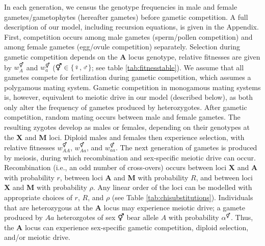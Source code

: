 \documentclass[12pt]{article}
\begin{document}
In each generation, we census the genotype frequencies in male and female gametes/gametophytes (hereafter gametes) before gametic competition. 
A full description of our model, including recursion equations, is given in the Appendix. 
First, competition occurs among male gametes (sperm/pollen competition) and among female gametes (egg/ovule competition) separately. 
Selection during gametic competition depends on the \textbf{A} locus genotype, relative fitnesses are given by $w_A^\Hermaphrodite$ and $w_a^\Hermaphrodite$ ($\Hermaphrodite \in \{\female,\male\}$; see table \ref{tab:fitnesstable}). %
We assume that all gametes compete for fertilization during gametic competition, which assumes a polygamous mating system. 
Gametic competition in monogamous mating systems is, however, equivalent to meiotic drive in our model (described below), as both only alter the frequency of gametes produced by heterozygotes. 
After gametic competition, random mating occurs between male and female gametes.
The resulting zygotes develop as males or females, depending on their genotypes at the \textbf{X} and \textbf{M} loci. %
Diploid males and females then experience selection, with relative fitnesses $w_{AA}^{\Hermaphrodite}$, $w_{Aa}^{\Hermaphrodite}$, and $w_{aa}^{\Hermaphrodite}$. %
The next generation of gametes is produced by meiosis, during which recombination and sex-specific meiotic drive can occur. 
Recombination (i.e., an odd number of cross-overs) occurs between loci \textbf{X} and \textbf{A} with probability $r$, between loci \textbf{A} and \textbf{M} with probability $R$, and between loci \textbf{X} and \textbf{M} with probability $\rho$.
Any linear order of the loci can be modelled with appropriate choices of $r$, $R$, and $\rho$ (see Table \ref{tab:chisubstitutions}). 
Individuals that are heterozygous at the \textbf{A} locus may experience meiotic drive; a gamete produced by $Aa$ heterozgotes of sex $\Hermaphrodite$ bear allele $A$ with probability $\alpha^\Hermaphrodite$. 
Thus, the \textbf{A} locus can experience sex-specific gametic competition, diploid selection, and/or meiotic drive. 
\end{document}
